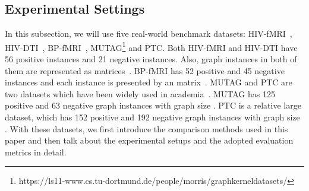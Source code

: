 \documentclass{article} \usepackage{iclr2020_conference,times}
\begin{document}
\vspace*{-10pt}
\subsection{Experimental Settings}
\vspace*{-5pt}
In this subsection, we will use five real-world benchmark datasets:  HIV-fMRI~\citet{cao2015identifying}, HIV-DTI~\citet{cao2015identifying},  BP-fMRI~\citet{cao2015identification}, MUTAG\footnote{\label{note1}https://ls11-www.cs.tu-dortmund.de/people/morris/graphkerneldatasets/ }
 and PTC. Both HIV-fMRI and HIV-DTI have 56 positive instances and 21 negative instances. Also, graph instances in both of them are represented as  matrices~\citet{cao2015identifying}. BP-fMRI has 52 positive and 45 negative instances and each instance is presented by an  matrix~\citet{cao2015identification}. MUTAG and PTC are two datasets which have been widely used in academia~\cite{xu2018powerful, shervashidze2009fast}. MUTAG has 125 positive and 63 negative graph instances with graph size . PTC is a relative large dataset, which has 152 positive and 192 negative graph instances with graph size . With these datasets, we first introduce the comparison methods used in this paper and then talk about the experimental setups and the adopted evaluation metrics in detail. 


\vspace*{-8pt}
\end{document}
